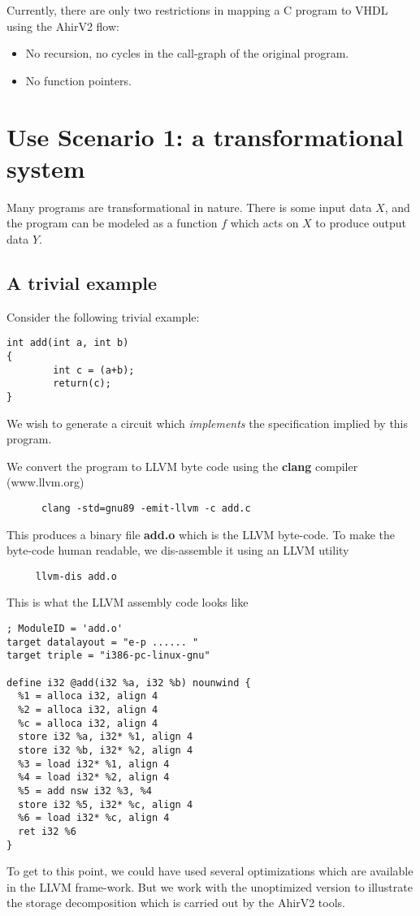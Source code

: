 Currently, there are only two restrictions in mapping
a C program to VHDL using the AhirV2 flow:
\begin{itemize}
\item No recursion, no cycles in the call-graph of the original
program.
\item No function pointers.
\end{itemize}

\section{Use Scenario 1:  a transformational system}

Many programs are transformational in nature.  There
is some input data $X$, and the program can be modeled as
a function $f$ which acts on $X$ to produce output data $Y$.

\subsection{A trivial example} \label{sec:Example}


Consider the following trivial example:
\begin{verbatim}
int add(int a, int b)
{
        int c = (a+b);
        return(c);
}
\end{verbatim}
We wish to generate a circuit which {\em implements}
the specification implied by this program.

We convert the program to LLVM byte code using
the {\bf clang} compiler (www.llvm.org)
\begin{verbatim}
      clang -std=gnu89 -emit-llvm -c add.c
\end{verbatim}
This produces a binary file {\bf add.o} which is
the LLVM byte-code.  To make the byte-code human
readable, we dis-assemble it using an LLVM utility
\begin{verbatim}
     llvm-dis add.o
\end{verbatim}
This is what the LLVM assembly code looks like
\begin{verbatim}
; ModuleID = 'add.o'
target datalayout = "e-p ...... "
target triple = "i386-pc-linux-gnu"

define i32 @add(i32 %a, i32 %b) nounwind {
  %1 = alloca i32, align 4
  %2 = alloca i32, align 4
  %c = alloca i32, align 4
  store i32 %a, i32* %1, align 4
  store i32 %b, i32* %2, align 4
  %3 = load i32* %1, align 4
  %4 = load i32* %2, align 4
  %5 = add nsw i32 %3, %4
  store i32 %5, i32* %c, align 4
  %6 = load i32* %c, align 4
  ret i32 %6
}
\end{verbatim}
To get to this point, we could have used several
optimizations which are available in the LLVM frame-work.
But we work with the unoptimized version to illustrate
the storage decomposition which is carried out by
the AhirV2 tools.

